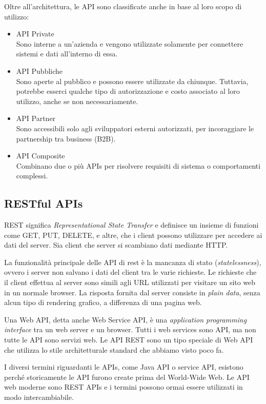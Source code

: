 Oltre all'architettura, le API sono classificate anche in base al loro scopo di utilizzo:
\begin{itemize}
    \item API Private\\
    Sono interne a un'azienda e vengono utilizzate solamente per connettere sistemi e dati all'interno di essa.
    \item API Pubbliche\\
    Sono aperte al pubblico e possono essere utilizzate da chiunque. Tuttavia, potrebbe esserci qualche tipo di autorizzazione e costo associato al loro utilizzo, anche se non necessariamente.
    \item API Partner\\
    Sono accessibili solo agli sviluppatori esterni autorizzati, per incoraggiare le partnership tra business (B2B).
    \item API Composite\\
    Combinano due o più APIs per risolvere requisiti di sistema o comportamenti complessi.
\end{itemize}

\subsection{RESTful APIs}
REST significa \textit{Representational State Transfer} e definisce un insieme di funzioni come GET, PUT, DELETE, e altre, che i client possono utilizzare per accedere ai dati del server. Sia client che server si scambiano dati mediante HTTP.

La funzionalità principale delle API di rest è la mancanza di stato (\textit{statelessness}), ovvero i server non salvano i dati del client tra le varie richieste. Le richieste che il client effettua al server sono simili agli URL utilizzati per visitare un sito web in un normale browser. La risposta fornita dal server consiste in \textit{plain data}, senza alcun tipo di rendering grafico, a differenza di una pagina web.

Una Web API, detta anche Web Service API, è una \textit{application programming interface} tra un web server e un browser. Tutti i web services sono API, ma non tutte le API sono servizi web. Le API REST sono un tipo speciale di Web API che utilizza lo stile architetturale standard che abbiamo visto poco fa.

I diversi termini riguardanti le APIs, come Java API o service API, esistono perché storicamente le API furono create prima del World-Wide Web. Le API web moderne sono REST APIs e i termini possono ormai essere utilizzati in modo intercambiabile.

